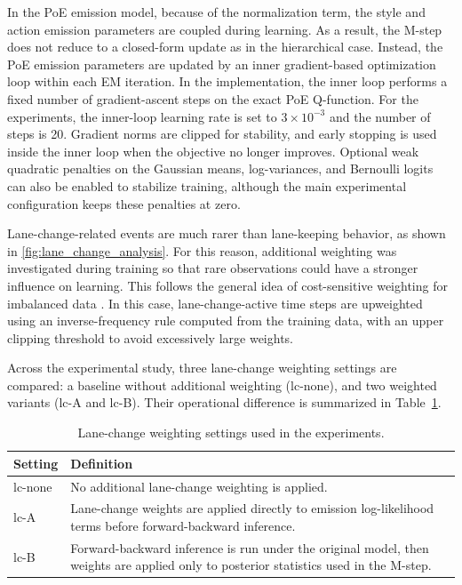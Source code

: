 \par In the \ac{PoE} emission model, because of the normalization term, the style and action emission parameters are coupled during learning. 
As a result, the M-step does not reduce to a closed-form update as in the hierarchical case. 
Instead, the \ac{PoE} emission parameters are updated by an inner gradient-based optimization loop within each EM iteration. 
In the implementation,  the inner loop performs a fixed number of gradient-ascent steps on the exact PoE Q-function. 
For the experiments, the inner-loop learning rate is set to \(3\times 10^{-3}\) and the number of steps is 20. 
Gradient norms are clipped for stability, and early stopping is used inside the inner loop when the objective no longer improves. 
Optional weak quadratic penalties on the Gaussian means, log-variances, and Bernoulli logits can also be enabled to stabilize training, 
although the main experimental configuration keeps these penalties at zero. 

\par Lane-change-related events are much rarer than lane-keeping behavior, as shown in \autoref{fig:lane_change_analysis}. 
For this reason, additional weighting was investigated during training so that rare observations could have a stronger influence on learning. 
This follows the general idea of cost-sensitive weighting for imbalanced data \cite{He2021WeightingRareEvents}.
In this case, lane-change-active time steps are upweighted using an inverse-frequency rule 
computed from the training data, with an upper clipping threshold to avoid excessively large weights.

\par Across the experimental study, three lane-change weighting settings are compared: a baseline without additional weighting (lc-none), and two weighted variants (lc-A and lc-B). Their operational difference is summarized in Table~\ref{tab:lc_weight_modes}.

\begin{table}[htbp]
\centering
\caption{Lane-change weighting settings used in the experiments.}
\label{tab:lc_weight_modes}
\begin{tabular}{l p{9.5cm}}
\toprule
Setting & Definition \\
\midrule
lc-none & No additional lane-change weighting is applied. \\
lc-A & Lane-change weights are applied directly to emission log-likelihood terms before forward-backward inference. \\
lc-B & Forward-backward inference is run under the original model, then weights are applied only to posterior statistics used in the M-step. \\
\bottomrule
\end{tabular}
\end{table}

